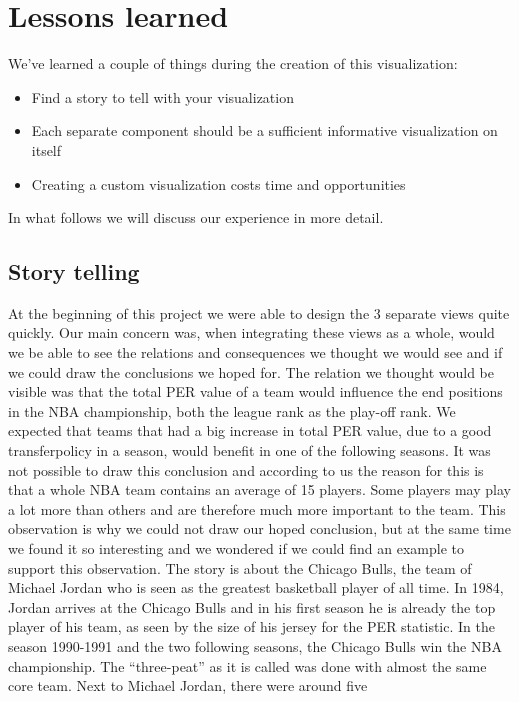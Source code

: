 \documentclass[]{sigchi}
\begin{document}
\section{Lessons learned}\label{sec:lessonslearned}
We've learned a couple of things during the creation of this visualization:
\begin{itemize}
    \item Find a story to tell with your visualization
    \item Each separate component should be a sufficient informative visualization on itself
    \item Creating a custom visualization costs time and opportunities
\end{itemize}
In what follows we will discuss our experience in more detail.

\subsection{Story telling}
At the beginning of this project we were able to design the 3 separate views
quite quickly. Our main concern was, when integrating these views as a whole, would 
we be able to see the relations and consequences we thought we would see and if 
we could draw the conclusions we hoped for. The relation we thought would be visible 
was that the total PER value of a team would influence the end positions in the NBA championship, both the league rank as the play-off rank. We expected that teams 
that had a big increase in total PER value, due to a good transferpolicy in a 
season, would benefit in one of the following seasons. It was not possible to draw this conclusion and according to us the reason for this is that a whole NBA team contains an average of 15 players. Some players may play a lot more than others and 
are therefore much more important to the team. This observation is why we could not draw our hoped conclusion, but at the same time we found it so interesting and we wondered if we could find an example to support this observation. The story is about 
the Chicago Bulls, the team of Michael Jordan who is seen as the greatest basketball 
player of all time. In 1984, Jordan arrives at the Chicago Bulls and in his first season he is already the top player of his team, as seen by the size of his jersey for the PER statistic. In the season 1990-1991 and the two following seasons, the 
Chicago Bulls win the NBA championship. The ``three-peat'' as it is called was done 
with almost the same core team. Next to Michael Jordan, there were around five 
\end{document}
